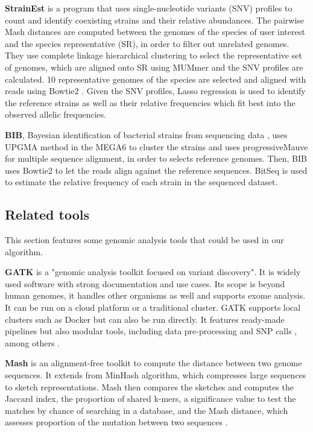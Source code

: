\documentclass{article}
\begin{document}
\textbf{StrainEst} \cite{StrainEst} is a program that uses single-nucleotide variants (SNV) profiles to count and identify coexisting strains and their relative abundances. The pairwise Mash distances \cite{Mash} are computed between the genomes of the species of user interest and the species representative (SR), in order to filter out unrelated genomes. They use complete linkage hierarchical clustering to select the representative set of genomes, which are aligned onto SR using MUMmer\cite{MUMmer} and the SNV profiles are calculated. 10 representative genomes of the species are selected and aligned with reads using Bowtie2 \cite{Bowtie}. Given the SNV profiles, Lasso regression is used to identify the reference strains as well as their relative frequencies which fit best into the observed allelic frequencies. 

\textbf{BIB}, Bayesian identification of bacterial strains from sequencing data \cite{mbs:/content/journal/mgen/10.1099/mgen.0.000075}, uses UPGMA method in the MEGA6 \cite{MEGA6} to cluster the strains and uses progressiveMauve \cite{progressive} for multiple sequence alignment, in order to selects reference genomes. Then, BIB uses Bowtie2 \cite{Bowtie} to let the reads align against the reference sequences. BitSeq \cite{bitSeq} is used to estimate the relative frequency of each strain in the sequenced dataset.

\subsection{Related tools} 
This section features some genomic analysis tools that could be used in our algorithm.

\textbf{GATK} is a "genomic analysis toolkit focused on variant discovery". It is widely used software with strong documentation and use cases. Its scope is beyond human genomes, it handles other organisms as well and supports exome analysis. It can be run on a cloud platform or a traditional cluster. GATK supports local clusters such as Docker but can also be run directly. It features ready-made pipelines but also modular tools, including data pre-processing and SNP calls \cite{tang_2016}, among others \cite{gatk, sezerman_ulgen_seymen_durasi_2019}.

\textbf{Mash} is an alignment-free toolkit to compute the distance between two genome sequences. It extends from MinHash algorithm, which compresses large sequences to sketch representations. Mash then compares the sketches and computes the Jaccard index, the proportion of shared k-mers, a significance value to test the matches by chance of searching in a database, and the Mash distance, which assesses proportion of the mutation between two sequences \cite{Mash}.
\end{document}
